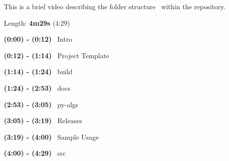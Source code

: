 

This is a brief video describing the folder structure~\newline
 within the repository.

Length\+: {\bfseries{4m29s}} (4\+:29)

{\bfseries{(0\+:00) -\/ (0\+:12)}}~\newline
 Intro

{\bfseries{(0\+:12) -\/ (1\+:14)}}~\newline
 Project Template

{\bfseries{(1\+:14) -\/ (1\+:24)}}~\newline
 build

{\bfseries{(1\+:24) -\/ (2\+:53)}}~\newline
 docs

{\bfseries{(2\+:53) -\/ (3\+:05)}}~\newline
 py-\/algs

{\bfseries{(3\+:05) -\/ (3\+:19)}}~\newline
 Releases

{\bfseries{(3\+:19) -\/ (4\+:00)}}~\newline
 Sample Usage

{\bfseries{(4\+:00) -\/ (4\+:29)}}~\newline
 src 